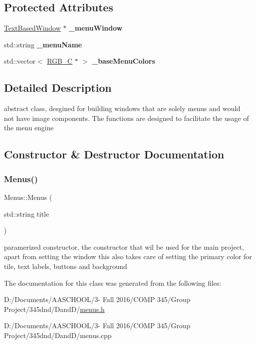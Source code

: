 \subsection*{Protected Attributes}
\begin{DoxyCompactItemize}
\item 
\hypertarget{class_menus_abe64451749421afbf7f668b5d28867eb}{}\label{class_menus_abe64451749421afbf7f668b5d28867eb} 
\hyperlink{class_text_based_window}{Text\+Based\+Window} $\ast$ {\bfseries \+\_\+menu\+Window}
\item 
\hypertarget{class_menus_ae654d6aa975ddc02613304b4bd4e32c2}{}\label{class_menus_ae654d6aa975ddc02613304b4bd4e32c2} 
std\+::string {\bfseries \+\_\+menu\+Name}
\item 
\hypertarget{class_menus_a8548fb85b7f3551d1f30007e85b06e97}{}\label{class_menus_a8548fb85b7f3551d1f30007e85b06e97} 
std\+::vector$<$ \hyperlink{struct_r_g_b___c}{R\+G\+B\+\_\+C} $\ast$ $>$ {\bfseries \+\_\+base\+Menu\+Colors}
\end{DoxyCompactItemize}


\subsection{Detailed Description}
abstract class, desgined for building windows that are solely menus and would not have image components. The functions are designed to facilitate the usage of the menu engine 

\subsection{Constructor \& Destructor Documentation}
\hypertarget{class_menus_a79335eb0ba0047d0d9a52a646b191c68}{}\label{class_menus_a79335eb0ba0047d0d9a52a646b191c68} 
\subsubsection{\texorpdfstring{Menus()}{Menus()}}
{\footnotesize\ttfamily Menus\+::\+Menus (\begin{DoxyParamCaption}\item[{std\+::string}]{title }\end{DoxyParamCaption})}

paramerized constructor, the constructor that wil be used for the main project, apart from setting the window this also takes care of setting the primary color for tile, text labels, buttons and background 

The documentation for this class was generated from the following files\+:\begin{DoxyCompactItemize}
\item 
D\+:/\+Documents/\+A\+A\+S\+C\+H\+O\+O\+L/3-\/ Fall 2016/\+C\+O\+M\+P 345/\+Group Project/345dnd/\+Dand\+D/\hyperlink{menus_8h}{menus.\+h}\item 
D\+:/\+Documents/\+A\+A\+S\+C\+H\+O\+O\+L/3-\/ Fall 2016/\+C\+O\+M\+P 345/\+Group Project/345dnd/\+Dand\+D/menus.\+cpp\end{DoxyCompactItemize}
